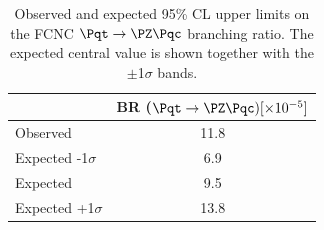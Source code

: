 \begin{table}[htbp]
	\centering
	\begin{tabular}{lc} 
		\toprule
		& BR ($\Pqt\rightarrow\PZ\Pqc) [\times 10^{-5}]$  \\
		\midrule
		Observed  				   					& 11.8  \\
		Expected -1$\sigma$   				  &   6.9 \\
		Expected                    				&  9.5 \\
		Expected +1$\sigma$  				 &  13.8 \\		
		\bottomrule
	\end{tabular}
	\caption{
		Observed and expected 95\% CL upper limits on the FCNC $\Pqt\rightarrow\PZ\Pqc$ branching ratio. 
		The expected central value is shown together with the $\pm$1$\sigma$ bands.
	}%
	\label{tab:results:limits_bonly_unb}
\end{table}

